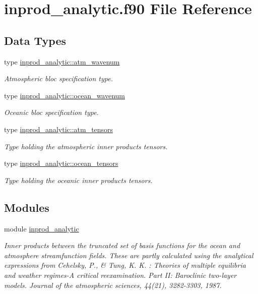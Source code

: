 \hypertarget{inprod__analytic_8f90}{}\section{inprod\+\_\+analytic.\+f90 File Reference}
\label{inprod__analytic_8f90}
\subsection*{Data Types}
\begin{DoxyCompactItemize}
\item 
type \hyperlink{structinprod__analytic_1_1atm__wavenum}{inprod\+\_\+analytic\+::atm\+\_\+wavenum}
\begin{DoxyCompactList}\small\item\em Atmospheric bloc specification type. \end{DoxyCompactList}\item 
type \hyperlink{structinprod__analytic_1_1ocean__wavenum}{inprod\+\_\+analytic\+::ocean\+\_\+wavenum}
\begin{DoxyCompactList}\small\item\em Oceanic bloc specification type. \end{DoxyCompactList}\item 
type \hyperlink{structinprod__analytic_1_1atm__tensors}{inprod\+\_\+analytic\+::atm\+\_\+tensors}
\begin{DoxyCompactList}\small\item\em Type holding the atmospheric inner products tensors. \end{DoxyCompactList}\item 
type \hyperlink{structinprod__analytic_1_1ocean__tensors}{inprod\+\_\+analytic\+::ocean\+\_\+tensors}
\begin{DoxyCompactList}\small\item\em Type holding the oceanic inner products tensors. \end{DoxyCompactList}\end{DoxyCompactItemize}
\subsection*{Modules}
\begin{DoxyCompactItemize}
\item 
module \hyperlink{namespaceinprod__analytic}{inprod\+\_\+analytic}
\begin{DoxyCompactList}\small\item\em Inner products between the truncated set of basis functions for the ocean and atmosphere streamfunction fields. These are partly calculated using the analytical expressions from Cehelsky, P., \& Tung, K. K. \+: Theories of multiple equilibria and weather regimes-\/A critical reexamination. Part II\+: Baroclinic two-\/layer models. Journal of the atmospheric sciences, 44(21), 3282-\/3303, 1987. \end{DoxyCompactList}\end{DoxyCompactItemize}
